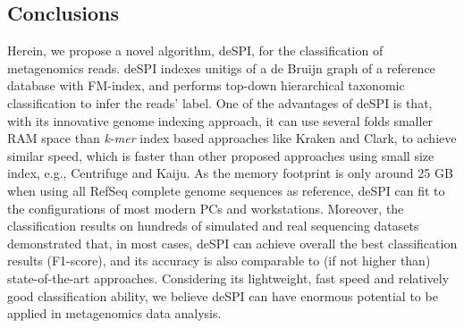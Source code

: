 \documentclass[a0,portrait]{a0poster}
\begin{document}
\begin{multicols}{2}
\section*{Conclusions}
Herein, we propose a novel algorithm, deSPI, for the classification of metagenomics reads. deSPI indexes unitigs of a de Bruijn graph of a reference database with FM-index, and performs top-down hierarchical taxonomic classification to infer the reads' label. One of the advantages of deSPI is that, with its innovative genome indexing approach, it can use several folds smaller RAM space than \textit{k-mer} index based approaches like Kraken and Clark, to achieve similar speed, which is faster than other proposed approaches using small size index, e.g., Centrifuge and Kaiju. As the memory footprint is only around 25 GB when using all RefSeq complete genome sequences as reference, deSPI can fit to the configurations of most modern PCs and workstations. Moreover, the classification results on hundreds of simulated and real sequencing datasets demonstrated that, in most cases, deSPI can achieve overall the best classification results (F1-score), and its accuracy is also comparable to (if not higher than) state-of-the-art approaches. Considering its lightweight, fast speed and relatively good classification ability, we believe deSPI can have enormous potential to be applied in metagenomics data analysis. 


\color{DarkSlateGray} %



\end{multicols}
\end{document}
